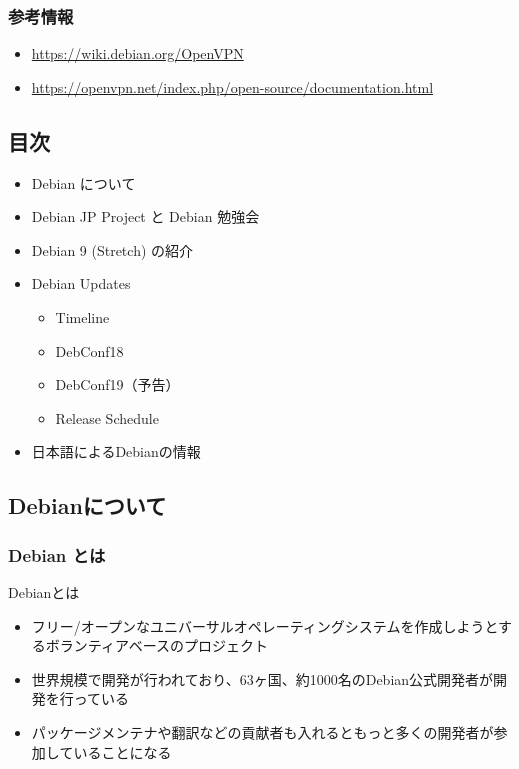 \documentclass[mingoth,a4paper]{jsarticle}
\begin{document}
\subsubsection{参考情報}

\begin{itemize}
\item \url{https://wiki.debian.org/OpenVPN}
\item \url{https://openvpn.net/index.php/open-source/documentation.html}
\end{itemize}

\newpage
\thispagestyle{empty}\mbox{}
\newpage



\subsection{目次}

\begin{itemize}
  \item Debian について
  \item Debian JP Project と Debian 勉強会
  \item Debian 9 (Stretch) の紹介
  \item Debian Updates
    \begin{itemize}
    \item Timeline
    \item DebConf18
    \item DebConf19（予告）
    \item Release Schedule
    \end{itemize}
  \item 日本語によるDebianの情報
\end{itemize}

\subsection{Debianについて}

\subsubsection{Debian とは}

Debianとは
\begin{itemize}
\item フリー/オープンなユニバーサルオペレーティングシステムを作成しようとするボランティアベースのプロジェクト
\item 世界規模で開発が行われており、63ヶ国、約1000名のDebian公式開発者が開発を行っている
\item パッケージメンテナや翻訳などの貢献者も入れるともっと多くの開発者が参加していることになる
\end{itemize}
\end{document}
